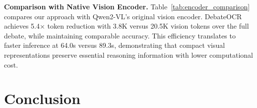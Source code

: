 \documentclass{article}
\theoremstyle{plain}
\theoremstyle{definition}
\theoremstyle{remark}
\begin{document}
\begin{table}[t]
\centering
\caption{Comparison of vision encoders on MATH with Qwen2.5-VL-7B using 5 rounds and 3 agents.}
\vspace{1mm}
\label{tab:encoder_comparison}
\end{table}

\textbf{Comparison with Native Vision Encoder.}
Table~\ref{tab:encoder_comparison} compares our approach with Qwen2-VL's original vision encoder. DebateOCR achieves 5.4× token reduction with 3.8K versus 20.5K vision 
tokens over the full debate, while maintaining comparable accuracy. This efficiency translates 
to faster inference at 64.0s versus 89.3s, demonstrating that compact visual representations preserve essential reasoning information with lower computational cost.


\section{Conclusion}
\label{sec:conclusion}
\end{document}
